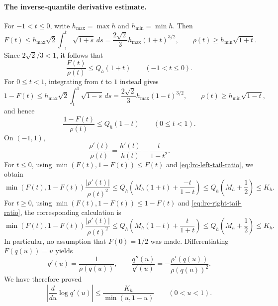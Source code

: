 \paragraph{The inverse-quantile derivative estimate.}
For $-1<t\leq0$, write $h_{\max}=\max h$ and $h_{\min}=\min h$.
Then
\[
 F(t)
 \leq h_{\max}\sqrt2\int_{-1}^t\sqrt{1+s}\,ds
 =\frac{2\sqrt2}{3}h_{\max}(1+t)^{3/2},
 \qquad
 \rho(t)\geq h_{\min}\sqrt{1+t}.
\]
Since $2\sqrt2/3<1$, it follows that
\begin{equation}\label{eq:lrc-left-tail-ratio}
 \frac{F(t)}{\rho(t)}\leq Q_h(1+t)
 \qquad(-1<t\leq0).
\end{equation}
For $0\leq t<1$, integrating from $t$ to $1$ instead gives
\[
 1-F(t)
 \leq h_{\max}\sqrt2\int_t^1\sqrt{1-s}\,ds
 =\frac{2\sqrt2}{3}h_{\max}(1-t)^{3/2},
 \qquad \rho(t)\geq h_{\min}\sqrt{1-t},
\]
and hence
\begin{equation}\label{eq:lrc-right-tail-ratio}
 \frac{1-F(t)}{\rho(t)}\leq Q_h(1-t)
 \qquad(0\leq t<1).
\end{equation}
On $(-1,1)$,
\[
 \frac{\rho'(t)}{\rho(t)}
 =\frac{h'(t)}{h(t)}-\frac{t}{1-t^2}.
\]
For $t\leq0$, using $\min(F(t),1-F(t))\leq F(t)$ and
\eqref{eq:lrc-left-tail-ratio}, we obtain
\[
 \min(F(t),1-F(t))\frac{|\rho'(t)|}{\rho(t)^2}
 \leq Q_h\left(M_h(1+t)+\frac{-t}{1-t}\right)
 \leq Q_h\left(M_h+\frac12\right)\leq K_h.
\]
For $t\geq0$, using $\min(F(t),1-F(t))\leq1-F(t)$ and
\eqref{eq:lrc-right-tail-ratio}, the corresponding calculation is
\[
 \min(F(t),1-F(t))\frac{|\rho'(t)|}{\rho(t)^2}
 \leq Q_h\left(M_h(1-t)+\frac{t}{1+t}\right)
 \leq Q_h\left(M_h+\frac12\right)\leq K_h.
\]
In particular, no assumption that $F(0)=1/2$ was made. Differentiating
$F(q(u))=u$ yields
\[
 q'(u)=\frac1{\rho(q(u))},\qquad
 \frac{q''(u)}{q'(u)}
 =-\frac{\rho'(q(u))}{\rho(q(u))^2}.
\]
We have therefore proved
\begin{equation}\label{eq:lrc-log-derivative}
 \left|\frac{d}{du}\log q'(u)\right|
 \leq\frac{K_h}{\min(u,1-u)}\qquad(0<u<1).
\end{equation}

